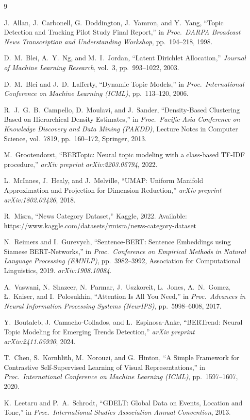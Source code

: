 \documentclass[10pt,twocolumn,a4paper]{article}
\begin{document}
\begin{thebibliography}{9}
\small

J.~Allan, J.~Carbonell, G.~Doddington, J.~Yamron, and Y.~Yang,
``Topic Detection and Tracking Pilot Study Final Report,''
in \emph{Proc.\ DARPA Broadcast News Transcription and Understanding Workshop},
pp.~194--218, 1998.

D.~M.~Blei, A.~Y.~Ng, and M.~I.~Jordan,
``Latent Dirichlet Allocation,''
\emph{Journal of Machine Learning Research}, vol.~3, pp.~993--1022, 2003.

D.~M.~Blei and J.~D.~Lafferty,
``Dynamic Topic Models,''
in \emph{Proc.\ International Conference on Machine Learning (ICML)},
pp.~113--120, 2006.

R.~J.~G.~B.~Campello, D.~Moulavi, and J.~Sander,
``Density-Based Clustering Based on Hierarchical Density Estimates,''
in \emph{Proc.\ Pacific-Asia Conference on Knowledge Discovery and Data Mining (PAKDD)},
Lecture Notes in Computer Science, vol.~7819, pp.~160--172, Springer, 2013.

M.~Grootendorst,
``BERTopic: Neural topic modeling with a class-based TF-IDF procedure,''
\emph{arXiv preprint arXiv:2203.05794}, 2022.

L.~McInnes, J.~Healy, and J.~Melville,
``UMAP: Uniform Manifold Approximation and Projection for Dimension Reduction,''
\emph{arXiv preprint arXiv:1802.03426}, 2018.

R.~Misra,
``News Category Dataset,''
Kaggle, 2022.
Available: \url{https://www.kaggle.com/datasets/rmisra/news-category-dataset}

N.~Reimers and I.~Gurevych,
``Sentence-BERT: Sentence Embeddings using Siamese BERT-Networks,''
in \emph{Proc.\ Conference on Empirical Methods in Natural Language Processing (EMNLP)},
pp.~3982--3992, Association for Computational Linguistics, 2019.
\emph{arXiv:1908.10084}.

A.~Vaswani, N.~Shazeer, N.~Parmar, J.~Uszkoreit, L.~Jones, A.~N.~Gomez,
{\L}.~Kaiser, and I.~Polosukhin,
``Attention Is All You Need,''
in \emph{Proc.\ Advances in Neural Information Processing Systems (NeurIPS)},
pp.~5998--6008, 2017.

Y.~Boutaleb, J.~Camacho-Collados, and L.~Espinosa-Anke,
``BERTrend: Neural Topic Modeling for Emerging Trends Detection,''
\emph{arXiv preprint arXiv:2411.05930}, 2024.

T.~Chen, S.~Kornblith, M.~Norouzi, and G.~Hinton,
``A Simple Framework for Contrastive Self-Supervised Learning of Visual Representations,''
in \emph{Proc.\ International Conference on Machine Learning (ICML)},
pp.~1597--1607, 2020.

K.~Leetaru and P.~A.~Schrodt,
``GDELT: Global Data on Events, Location and Tone,''
in \emph{Proc.\ International Studies Association Annual Convention}, 2013.

\end{thebibliography}
\end{document}
